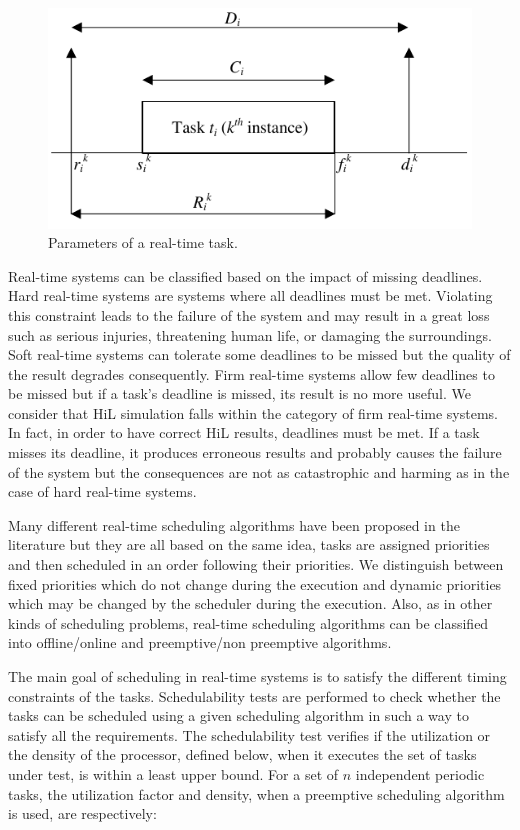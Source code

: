 \begin{figure}[h]
\centering
\captionsetup{justification=centering}
\includegraphics{figures/taskmodel}
\caption{Parameters of a real-time task.}
\label{fig:taskmodel}
\end{figure} 

Real-time systems can be classified based on the impact of missing deadlines. Hard real-time systems are systems where all deadlines must be met. Violating this constraint leads to the failure of the system and may result in a great loss such as serious injuries, threatening human life, or damaging the surroundings. Soft real-time systems can tolerate some deadlines to be missed but the quality of the result degrades consequently. Firm real-time systems allow few deadlines to be missed but if a task's deadline is missed, its result is no more useful. We consider that HiL simulation falls within the category of firm real-time systems. In fact, in order to have correct HiL results, deadlines must be met. If a task misses its deadline, it produces erroneous results and probably causes the failure of the system but the consequences are not as catastrophic and harming as in the case of hard real-time systems.   

Many different real-time scheduling algorithms have been proposed in the literature but they are all based on the same idea, tasks are assigned priorities and then scheduled in an order following their priorities. We distinguish between fixed priorities which do not change during the execution and dynamic priorities which may be changed by the scheduler during the execution. Also, as in other kinds of scheduling problems, real-time scheduling algorithms can be classified into offline/online and preemptive/non preemptive algorithms.

The main goal of scheduling in real-time systems is to satisfy the different timing constraints of the tasks. Schedulability tests are performed to check whether the tasks can be scheduled using a given scheduling algorithm in such a way to satisfy all the requirements. The schedulability test verifies if the utilization or the density of the processor, defined below, when it executes the set of tasks under test, is within a least upper bound. For a set of $n$ independent periodic tasks, the utilization factor and density, when a preemptive scheduling algorithm is used, are respectively:

